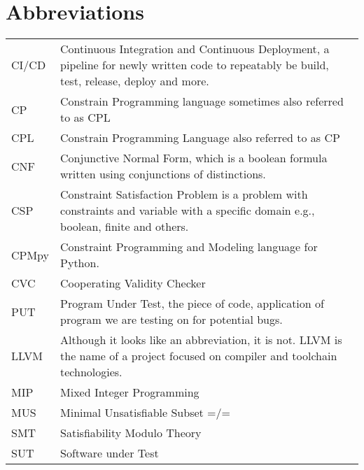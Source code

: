 \documentclass[master=cws,masteroption=se,english]{kulemt}
\begin{document}
\section*{Abbreviations}
\begin{flushleft}
  \renewcommand{\arraystretch}{1.1}
  \begin{tabularx}{\textwidth}{@{}p{14mm}X@{}}


	CI/CD & Continuous Integration and Continuous Deployment, a pipeline for newly written code to repeatably be build, test, release, deploy and more. \\
    CP & Constrain Programming language sometimes also referred to as CPL \\
    CPL & Constrain Programming Language also referred to as CP \\
    CNF & Conjunctive Normal Form, which is a boolean formula written using conjunctions of distinctions. \\
    CSP & Constraint Satisfaction Problem is a problem with constraints and variable with a specific domain e.g., boolean, finite and others.\\
    CPMpy & Constraint Programming and Modeling language for Python.\\
    CVC & Cooperating Validity Checker \\
    PUT & Program Under Test, the piece of code, application of program we are testing on for potential bugs. \\
    LLVM & Although it looks like an abbreviation, it is not. LLVM is the name of a project focused on compiler and toolchain technologies. \\
    MIP & Mixed Integer Programming \\
    MUS & Minimal Unsatisfiable Subset =/=  \\
    SMT & Satisfiability Modulo Theory\\
    SUT & Software under Test \\
  \end{tabularx}
\end{flushleft}
\end{document}
